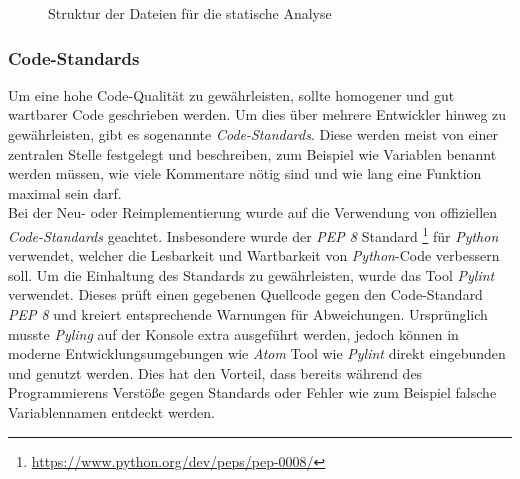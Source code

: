 \begin{figure}
\caption{Struktur der Dateien für die statische Analyse}
\label{fig:MobSFStrukAndroid}
\end{figure}

\newpage
\subsubsection{Code-Standards}\label{pylintering}
Um eine hohe Code-Qualität zu gewährleisten, sollte homogener und gut wartbarer Code geschrieben werden. Um dies über mehrere Entwickler hinweg zu gewährleisten, gibt es sogenannte \textit{Code-Standards}. Diese werden meist von einer zentralen Stelle festgelegt und beschreiben, zum Beispiel wie Variablen benannt werden müssen, wie viele Kommentare nötig sind und wie lang eine Funktion maximal sein darf.\\

Bei der Neu- oder Reimplementierung wurde auf die Verwendung von offiziellen \textit{Code-Standards} geachtet. Insbesondere wurde der\textit{ PEP 8} Standard \footnote{\url{https://www.python.org/dev/peps/pep-0008/}} für \textit{Python} verwendet, welcher die Lesbarkeit und Wartbarkeit von \textit{Python}-Code verbessern soll. Um die Einhaltung des Standards zu gewährleisten, wurde das Tool \textit{Pylint} verwendet. Dieses prüft einen gegebenen Quellcode gegen den Code-Standard \textit{PEP 8} und kreiert entsprechende Warnungen für Abweichungen. Ursprünglich musste \textit{Pyling} auf der Konsole extra ausgeführt werden, jedoch können in moderne Entwicklungsumgebungen wie \textit{Atom} Tool wie \textit{Pylint} direkt eingebunden und genutzt werden. Dies hat den Vorteil, dass bereits während des Programmierens Verstöße gegen Standards oder Fehler wie zum Beispiel falsche Variablennamen entdeckt werden.\\

